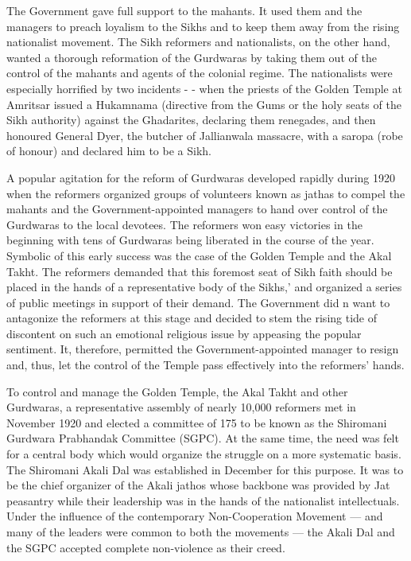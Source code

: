 The Government gave full support to the mahants. It used them and the managers to preach loyalism to the Sikhs and to keep them away from the rising nationalist movement. The Sikh reformers and nationalists, on the other hand, wanted a thorough reformation of the Gurdwaras by taking them out of the control of the mahants and agents of the colonial regime. The nationalists were especially horrified by two incidents - - when the priests of the Golden Temple at Amritsar issued a Hukamnama (directive from the Gums or the holy seats of the Sikh authority) against the Ghadarites, declaring them renegades, and then honoured General Dyer, the butcher of Jallianwala massacre, with a saropa (robe of honour) and declared him to be a Sikh.

A popular agitation for the reform of Gurdwaras developed rapidly during 1920 when the reformers organized groups of volunteers known as jathas to compel the mahants and the Government-appointed managers to hand over control of the Gurdwaras to the local devotees. The reformers won easy victories in the beginning with tens of Gurdwaras being liberated in the course of the year. Symbolic of this early success was the case of the Golden Temple and the Akal Takht. The reformers demanded that this foremost seat of Sikh faith should be placed in the hands of a representative body of the Sikhs,' and organized a series of public meetings in support of their demand. The Government did n want to antagonize the reformers at this stage and decided to stem the rising tide of discontent on such an emotional religious issue by appeasing the popular sentiment. It, therefore, permitted the Government-appointed manager to resign and, thus, let the control of the Temple pass effectively into the reformers' hands.

To control and manage the Golden Temple, the Akal Takht and other Gurdwaras, a representative assembly of nearly 10,000 reformers met in November 1920 and elected a committee of 175 to be known as the Shiromani Gurdwara Prabhandak Committee (SGPC). At the same time, the need was felt for a central body which would organize the struggle on a more systematic basis. The Shiromani Akali Dal was established in December for this purpose. It was to be the chief organizer of the Akali jathos whose backbone was provided by Jat peasantry while their leadership was in the hands of the nationalist intellectuals. Under the influence of the contemporary Non-Cooperation Movement --- and many of the leaders were common to both the movements --- the Akali Dal and the SGPC accepted complete non-violence as their creed.

